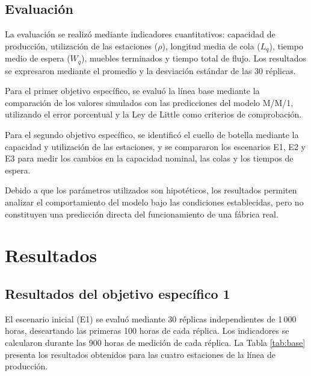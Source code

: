 \documentclass[conference,a4paper]{IEEEtran}
\begin{document}
\subsection{Evaluación}
La evaluación se realizó mediante indicadores cuantitativos: capacidad de producción,
utilización de las estaciones ($\rho$), longitud media de cola ($L_q$), tiempo medio de
espera ($W_q$), muebles terminados y tiempo total de flujo. Los resultados se expresaron
mediante el promedio y la desviación estándar de las 30 réplicas.

Para el primer objetivo específico, se evaluó la línea base mediante la comparación de los
valores simulados con las predicciones del modelo M/M/1, utilizando el error porcentual y la
Ley de Little como criterios de comprobación.

Para el segundo objetivo específico, se identificó el cuello de botella mediante la capacidad
y utilización de las estaciones, y se compararon los escenarios E1, E2 y E3 para medir los
cambios en la capacidad nominal, las colas y los tiempos de espera.

Debido a que los parámetros utilizados son hipotéticos, los resultados permiten analizar el
comportamiento del modelo bajo las condiciones establecidas, pero no constituyen una
predicción directa del funcionamiento de una fábrica real.

\section{Resultados}
\subsection{Resultados del objetivo específico 1}
El escenario inicial (E1) se evaluó mediante 30 réplicas independientes de 1\,000 horas,
descartando las primeras 100 horas de cada réplica. Los indicadores se calcularon durante las
900 horas de medición de cada réplica. La Tabla \ref{tab:base} presenta los resultados
obtenidos para las cuatro estaciones de la línea de producción.
\end{document}
